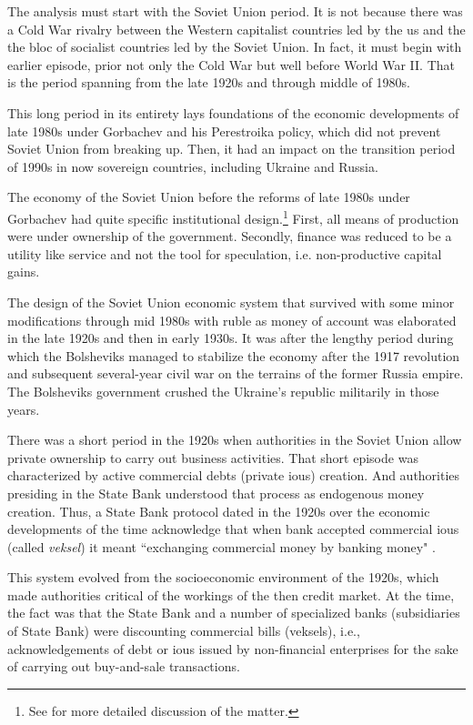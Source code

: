 The analysis must start with the Soviet Union period. It is not because there was
a Cold War rivalry between the Western capitalist countries led by the \acf{us} and the
the bloc of socialist countries led by the Soviet Union. In fact, it must begin with earlier episode, prior not only the Cold War but well before World War II. That is the period spanning from the late 1920s and through middle of 1980s.

This long period in its entirety lays
foundations of the economic developments of late 1980s under Gorbachev
and his Perestroika policy, which did not prevent Soviet Union from
breaking up. Then, it had an impact on the transition period of 1990s in
now sovereign countries, including Ukraine and Russia.

The economy of the Soviet Union before the reforms of late 1980s under
Gorbachev had quite specific institutional design.\footnote{See \citep{valchyshen_ru98} for more detailed discussion of the matter.} First, all means
of production were under ownership of the government. Secondly, finance
was reduced to be a utility like service and not the tool for
speculation, i.e. non-productive capital gains.

The design of the Soviet Union economic system that survived with some
minor modifications through mid 1980s with ruble as money of
account was elaborated in the late 1920s and then in early 1930s. It was after the
lengthy period during which the Bolsheviks managed to stabilize the
economy after the 1917 revolution and subsequent several-year civil war
on the terrains of the former Russia empire. The Bolsheviks government
crushed the Ukraine's republic militarily in those years.

There was a short period in the 1920s when authorities in the Soviet
Union allow private ownership to carry out business activities. That
short episode was characterized by active commercial debts (private
\acp{iou}) creation. And authorities presiding in the State Bank understood
that process as endogenous money creation. Thus, a State Bank protocol
dated in the 1920s over the economic developments of the time
acknowledge that when bank accepted commercial \acp{iou} (called \textit{veksel}) it
meant ``exchanging commercial money by banking money"
\citep[pp.~40-44]{cbr2008}. 

This system evolved from the socioeconomic environment of the 1920s, which made authorities critical of the workings of the then credit market. At the time, the fact was that the State Bank and a number of specialized banks (subsidiaries of State Bank) were discounting commercial bills (veksels), i.e., acknowledgements of debt or \acp{iou} issued by non-financial enterprises for the sake of carrying out buy-and-sale transactions. 

